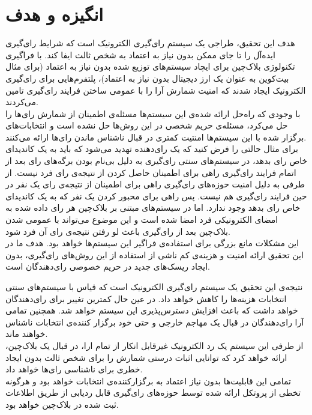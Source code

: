 \section{انگیزه و هدف}
هدف این تحقیق، طراجی یک سیستم رای‌گیری الکترونیک است که شرایط رای‌گیری ایده‌آل را تا جای ممکن بدون نیاز به اعتماد به شخص ثالث ایفا کند. با فراگیری تکنولوژی بلاک‌چین برای ایچاد سیستم‌های توزیع شده بدون نیاز به اعتماد (برای مثال بیت‌کوین به عنوان یک‌ ارز دیجیتال بدون نیاز به اعتماد)، پلتفرم‌هایی برای رای‌گیری الکترونیک ایجاد شدند که امنیت شمارش آرا را با عمومی ساختن فرایند رای‌گیری تامین می‌کردند. 
\\
با وجودی که راه‌حل ارائه شده‌ی این سیستم‌ها مسئله‌ی اطمینان از شمارش رای‌ها را حل می‌کرد، مسئله‌ی حریم شخصی در این روش‌ها حل نشده است و انتخابات‌های برگزار شده با این سیستم‌ها امنتیت کمتری در قبال ناشناس ماندن رای‌ها ارائه می‌کنند. 
\\
برای مثال حالتی را فرض کنید که یک رای‌دهنده تهدید می‌شود که باید به یک کاندیدای خاص رای بدهد، در سیستم‌های سنتی رای‌گیری به دلیل بی‌نام بودن برگه‌های رای بعد از اتمام فرایند رای‌گیری راهی برای اطمینان حاصل کردن از نتیجه‌ی رای فرد نیست. از طرفی به دلیل امنیت حوزه‌های رای‌گیری راهی برای اطمینان از نتیجه‌ی رای یک نفر در حین فرایند رای‌گیری هم نیست. پس راهی برای محبور کردن یک نفر که به یک کاندیدای خاص رای بدهد وجود ندارد. اما در سیستم‌های مبتنی بر بلاک‌چین هر رای داده شده به امضای الکترونیکی فرد امضا شده است و این موضوع می‌تواند با عمومی شدن بلاک‌چین بعد از رای‌گیری باعث لو رفتن نتیجه‌ی رای آن فرد شود.
\\
این مشکلات مانع بزرگی برای استفاده‌ی فراگیر این سیستم‌ها خواهد بود. هدف ما در این تحقیق ارائه امنیت و هزینه‌ی کم ناشی از استفاده از این روش‌های رای‌گیری، بدون ایجاد ریسک‌های جدید در حریم خصوصی رای‌دهندگان است. 
\par
نتیجه‌ی این تحقیق یک سیستم‌ رای‌گیری الکترونیک است که قیاس با سیستم‌های سنتی انتخابات هزینه‌ها را کاهش خواهد داد. در عین حال کمترین تغییر برای رای‌دهندگان خواهد داشت که باعث افزایش دسترس‌پذیری این سیستم خواهد شد. همچنین تمامی آرا رای‌دهندگان در قبال یک مهاجم خارجی و حتی خود برگزار کننده‌ی انتخابات ناشناس خواهند ماند. 
\\
از طرفی این سیستم یک رد الکترونیک غیرقابل انکار از تمام ارا، در قبال یک بلاک‌چین، ارائه ‌خواهد کرد که توانایی اثبات درستی شمارش را برای شخص ثالث بدون ایجاد خطری برای ناشناسی رای‌ها خواهد داد. 
\\
تمامی این قابلیت‌ها بدون نیاز اعتماد به برگزارکننده‌ی انتخابات خواهد بود و هرگونه تخطی از پروتکل ارائه شده توسط حوزه‌های رای‌گیری قابل ردیابی از طریق اطلاعات ثبت شده در بلاک‌چین خواهد بود.

